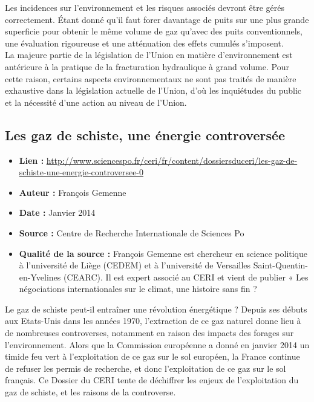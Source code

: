 \documentclass[8pt]{article}
\begin{document}
Les incidences sur l’environnement et les risques associés devront être gérés correctement. Étant donné qu'il faut forer davantage de puits sur une plus grande superficie pour obtenir le même volume de gaz qu'avec des puits conventionnels, une évaluation rigoureuse et une atténuation des effets cumulés s'imposent.\\

La majeure partie de la législation de l'Union en matière d’environnement est antérieure à la pratique de la fracturation hydraulique à grand volume. Pour cette raison, certains aspects environnementaux ne sont pas traités de manière exhaustive dans la législation actuelle de l’Union, d'où les inquiétudes du public et la nécessité d'une action au niveau de l’Union.

\newpage
\subsection{Les gaz de schiste, une énergie controversée}
 
\begin{itemize}
	\item \textbf{Lien : }  \url{http://www.sciencespo.fr/ceri/fr/content/dossiersduceri/les-gaz-de-schiste-une-energie-controversee-0} 
	\item \textbf{Auteur : } François Gemenne
	\item \textbf{Date : } Janvier 2014
	\item \textbf{Source : } Centre de Recherche Internationale de Sciences Po 
	\item \textbf{Qualité de la source : } François Gemenne est chercheur en science politique à l'université de Liège (CEDEM) et à l'université de Versailles Saint-Quentin-en-Yvelines (CEARC). Il est expert associé au CERI et   vient de publier « Les négociations internationales sur le climat, une histoire sans fin ?
\end{itemize}

Le gaz de schiste peut-il entraîner une révolution énergétique ? Depuis ses débuts aux Etats-Unis dans les années 1970, l’extraction de ce gaz naturel donne lieu à de nombreuses controverses, notamment en raison des impacts des forages sur l’environnement. Alors que la Commission européenne a donné en janvier 2014 un timide feu vert à l’exploitation de ce gaz sur le sol européen, la France continue de refuser les permis de recherche, et donc l’exploitation de ce gaz sur le sol français. Ce Dossier du CERI tente de déchiffrer les enjeux de l’exploitation du gaz de schiste, et les raisons de la controverse.  \\
\end{document}
